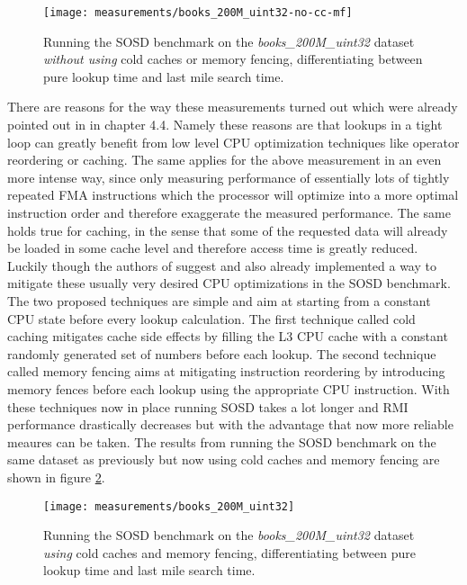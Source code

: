 \begin{figure}[!h]
  \centering
  \texttt{[image: measurements/books\_200M\_uint32-no-cc-mf]}
  \caption[Lookup and last mile search time measures \emph{without using} cold caches and memory fencing]{
    Running the SOSD benchmark on the \emph{books\_200M\_uint32} dataset \emph{without using} cold caches or memory fencing, differentiating between pure lookup time and last mile search time.
  }
  \label{fig:books_200M_uint32-no-cc-mf}
\end{figure}

There are reasons for the way these measurements turned out which were already pointed out in \cite{sosd-neurips} in chapter 4.4. Namely these reasons are that lookups in a tight loop can greatly benefit from low level CPU optimization techniques like operator reordering or caching. The same applies for the above measurement in an even more intense way, since only measuring performance of essentially lots of tightly repeated FMA instructions which the processor will optimize into a more optimal instruction order and therefore exaggerate the measured performance. The same holds true for caching, in the sense that some of the requested data will already be loaded in some cache level and therefore access time is greatly reduced. Luckily though the authors of \cite{sosd-neurips} suggest and also already implemented a way to mitigate these usually very desired CPU optimizations in the SOSD benchmark. The two proposed techniques are simple and aim at starting from a constant CPU state before every lookup calculation. The first technique called cold caching mitigates cache side effects by filling the L3 CPU cache with a constant randomly generated set of numbers before each lookup. The second technique called memory fencing aims at mitigating instruction reordering by introducing memory fences before each lookup using the appropriate CPU instruction. With these techniques now in place running SOSD takes a lot longer and RMI performance drastically decreases but with the advantage that now more reliable meaures can be taken. The results from running the SOSD benchmark on the same dataset as previously but now using cold caches and memory fencing are shown in figure \ref{fig:books_200M_uint32}.

\begin{figure}[ht]
  \centering
  \texttt{[image: measurements/books\_200M\_uint32]}
  \caption[Lookup and last mile search time measures \emph{using} cold caches and memory fencing]{
    Running the SOSD benchmark on the \emph{books\_200M\_uint32} dataset \emph{using} cold caches and memory fencing, differentiating between pure lookup time and last mile search time.
  }
  \label{fig:books_200M_uint32}
\end{figure}

